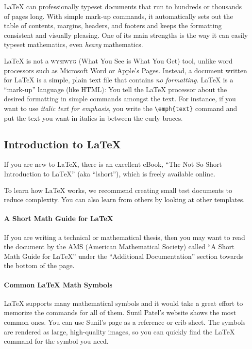 LaTeX can professionally typeset documents that run to hundreds or thousands of pages long. With simple mark-up commands, it automatically sets out the table of contents, margins, headers, and footers and keeps the formatting consistent and visually pleasing. One of its main strengths is the way it can easily typeset mathematics, even \emph{heavy} mathematics.

LaTeX is not a \textsc{wysiwyg} (What You See is What You Get) tool, unlike word processors such as Microsoft Word or Apple's Pages. Instead, a document written for LaTeX is a simple, plain text file that contains \emph{no formatting}. LaTeX is a \enquote{mark-up} language (like HTML): You tell the LaTeX processor about the desired formatting in simple commands amongst the text. For instance, if you want to use \emph{italic text for emphasis}, you write the \verb|\emph{text}| command and put the text you want in italics in between the curly braces.

\subsection{Introduction to LaTeX}

If you are new to LaTeX, there is an excellent eBook, \enquote{The Not So Short Introduction to LaTeX} (aka ``lshort''), which is freely available online.

To learn how LaTeX works, we recommend creating small test documents to reduce complexity. You can also learn from others by looking at other templates.

\paragraph{A Short Math Guide for LaTeX}

If you are writing a technical or mathematical thesis, then you may want to read the document by the AMS (American Mathematical Society) called \enquote{A Short Math Guide for LaTeX}
under the \enquote{Additional Documentation} section towards the bottom of the page.

\paragraph{Common LaTeX Math Symbols}
LaTeX supports many mathematical symbols and it would take a great effort to memorize the commands for all of them. Sunil Patel's website shows the most common ones.
You can use Sunil's page as a reference or crib sheet. The symbols are rendered as large, high-quality images, so you can quickly find the LaTeX command for the symbol you need.

